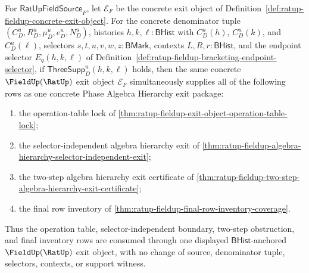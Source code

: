 \begin{theorem}
\label{thm:ratup-fieldup-selector-independent-two-step-final-inventory}
For $\mathsf{RatUpFieldSource}_F$, let $\mathcal E_F$ be the concrete exit
object of Definition~\ref{def:ratup-fieldup-concrete-exit-object}. For the
concrete denominator tuple $(C_D^u,R_D^u,\mu_D^u,e_D^u,N_D^u)$, histories
$h,k,\ell:\mathsf{BHist}$ with $C_D^u(h)$, $C_D^u(k)$, and $C_D^u(\ell)$,
selectors $s,t,u,v,w,z:\mathsf{BMark}$, contexts
$L,R,r:\mathsf{BHist}$, and the endpoint selector $E_q(h,k,\ell)$ of
Definition~\ref{def:ratup-fieldup-bracketing-endpoint-selector}, if
$\mathsf{ThreeSupp}_D^u(h,k,\ell)$ holds, then the same concrete
$\FieldUp(\RatUp)$ exit object $\mathcal E_F$ simultaneously supplies all of
the following rows as one concrete Phase Algebra Hierarchy exit package:
\begin{enumerate}
  \item the operation-table lock of
  \autoref{thm:ratup-fieldup-exit-object-operation-table-lock};
  \item the selector-independent algebra hierarchy exit of
  \autoref{thm:ratup-fieldup-algebra-hierarchy-selector-independent-exit};
  \item the two-step algebra hierarchy exit certificate of
  \autoref{thm:ratup-fieldup-two-step-algebra-hierarchy-exit-certificate};
  \item the final row inventory of
  \autoref{thm:ratup-fieldup-final-row-inventory-coverage}.
\end{enumerate}
Thus the operation table, selector-independent boundary, two-step obstruction,
and final inventory rows are consumed through one displayed
$\mathsf{BHist}$-anchored $\FieldUp(\RatUp)$ exit object, with no change of
source, denominator tuple, selectors, contexts, or support witness.
\end{theorem}
